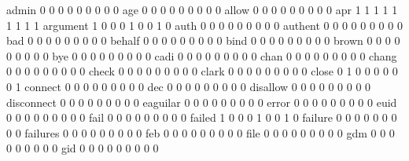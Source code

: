 \documentclass[compress,8pt]{beamer}
\begin{document}
\begin{frame}
\begin{Schunk}
  admin                                      0   0   0   0   0   0   0   0   0
  age                                        0   0   0   0   0   0   0   0   0
  allow                                      0   0   0   0   0   0   0   0   0
  apr                                        1   1   1   1   1   1   1   1   1
  argument                                   1   0   0   0   1   0   0   1   0
  auth                                       0   0   0   0   0   0   0   0   0
  authent                                    0   0   0   0   0   0   0   0   0
  bad                                        0   0   0   0   0   0   0   0   0
  behalf                                     0   0   0   0   0   0   0   0   0
  bind                                       0   0   0   0   0   0   0   0   0
  brown                                      0   0   0   0   0   0   0   0   0
  bye                                        0   0   0   0   0   0   0   0   0
  cadi                                       0   0   0   0   0   0   0   0   0
  chan                                       0   0   0   0   0   0   0   0   0
  chang                                      0   0   0   0   0   0   0   0   0
  check                                      0   0   0   0   0   0   0   0   0
  clark                                      0   0   0   0   0   0   0   0   0
  close                                      0   1   0   0   0   0   0   0   1
  connect                                    0   0   0   0   0   0   0   0   0
  dec                                        0   0   0   0   0   0   0   0   0
  disallow                                   0   0   0   0   0   0   0   0   0
  disconnect                                 0   0   0   0   0   0   0   0   0
  eaguilar                                   0   0   0   0   0   0   0   0   0
  error                                      0   0   0   0   0   0   0   0   0
  euid                                       0   0   0   0   0   0   0   0   0
  fail                                       0   0   0   0   0   0   0   0   0
  failed                                     1   0   0   0   1   0   0   1   0
  failure                                    0   0   0   0   0   0   0   0   0
  failures                                   0   0   0   0   0   0   0   0   0
  feb                                        0   0   0   0   0   0   0   0   0
  file                                       0   0   0   0   0   0   0   0   0
  gdm                                        0   0   0   0   0   0   0   0   0
  gid                                        0   0   0   0   0   0   0   0   0

\end{Schunk}
\end{frame}
\end{document}
